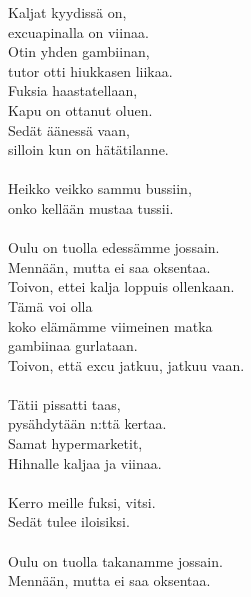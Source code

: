 
            Kaljat kyydissä on, \\
            excuapinalla on viinaa. \\
            Otin yhden gambiinan, \\
            tutor otti hiukkasen liikaa. \\
            Fuksia haastatellaan, \\
            Kapu on ottanut oluen. \\
            Sedät äänessä vaan, \\
            silloin kun on hätätilanne. \\
\hspace{10mm} \\
            Heikko veikko sammu bussiin, \\
            onko kellään mustaa tussii. \\
\hspace{10mm} \\
            Oulu on tuolla edessämme jossain. \\
            Mennään, mutta ei saa oksentaa. \\
            Toivon, ettei kalja loppuis ollenkaan. \\
            Tämä voi olla \\
            koko elämämme viimeinen matka \\
            gambiinaa gurlataan. \\
            Toivon, että excu jatkuu, jatkuu vaan. \\
\hspace{10mm} \\
            Tätii pissatti taas, \\
            pysähdytään n:ttä kertaa. \\
            Samat hypermarketit, \\
            Hihnalle kaljaa ja viinaa. \\
\hspace{10mm} \\
            Kerro meille fuksi, vitsi. \\
            Sedät tulee iloisiksi. \\
\hspace{10mm} \\
            Oulu on tuolla takanamme jossain. \\
            Mennään, mutta ei saa oksentaa. \\
